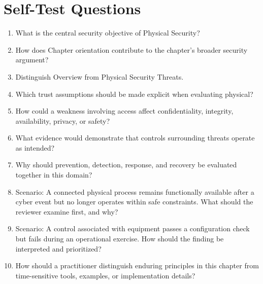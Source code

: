 \documentclass[11pt]{article}
\begin{document}
\section*{Self-Test Questions}
\begin{enumerate}
\item What is the central security objective of Physical Security?
\item How does Chapter orientation contribute to the chapter's broader security argument?
\item Distinguish Overview from Physical Security Threats.
\item Which trust assumptions should be made explicit when evaluating physical?
\item How could a weakness involving access affect confidentiality, integrity, availability, privacy, or safety?
\item What evidence would demonstrate that controls surrounding threats operate as intended?
\item Why should prevention, detection, response, and recovery be evaluated together in this domain?
\item Scenario: A connected physical process remains functionally available after a cyber event but no longer operates within safe constraints. What should the reviewer examine first, and why?
\item Scenario: A control associated with equipment passes a configuration check but fails during an operational exercise. How should the finding be interpreted and prioritized?
\item How should a practitioner distinguish enduring principles in this chapter from time-sensitive tools, examples, or implementation details?
\end{enumerate}
\end{document}
